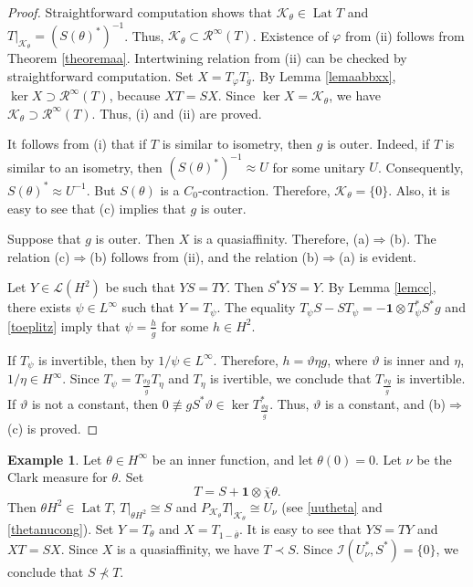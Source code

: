 \documentclass[a4paper,oneside,11pt]{amsart}
\numberwithin{equation}{section}
\theoremstyle{plain}
\theoremstyle{definition}
\newtheorem{example}[theorem]{Example}
\begin{document}
\begin{proof} Straightforward computation shows that 
 $\mathcal K_\theta\in\operatorname{Lat}T$  and $T|_{\mathcal K_\theta}=(S(\theta)^*)^{-1}$. 
Thus, $\mathcal K_\theta\subset\mathcal R^\infty(T)$. Existence of $\varphi$ from (ii) follows from Theorem
\ref{theoremaa}. Intertwining relation from (ii) can be checked by straightforward computation. 
Set $X= T_\varphi T_{\overline g}$. By Lemma \ref{lemaabbxx},   $\ker X\supset\mathcal R^\infty(T)$, 
because $XT=SX$. Since $\ker X=\mathcal K_\theta$, we have $\mathcal K_\theta\supset\mathcal R^\infty(T)$. 
Thus, (i) and (ii) are proved. 


It follows from (i) that if $T$ is similar to isometry, then $g$ is outer. Indeed, if $T$ is similar to an isometry, then 
 $(S(\theta)^*)^{-1}\approx U$ for some unitary $U$. Consequently, $S(\theta)^*\approx U^{-1}$. 
But $S(\theta)$ is a $C_0$-contraction. Therefore, $\mathcal K_\theta=\{0\}$. Also, it is easy to see that (c) implies that $g$ is outer. 

Suppose that $g$ is outer. Then $X$ is a quasiaffinity. Therefore, (a)$\Rightarrow$(b). The relation (c)$\Rightarrow$(b) follows from (ii), and the relation (b)$\Rightarrow$(a) is evident.

Let $Y\in\mathcal L(H^2)$ be such that $YS=TY$. Then $S^*YS=Y$. By Lemma \ref{lemcc},  
 there exists $\psi\in L^\infty$ such that 
$Y=T_\psi$. The equality $T_\psi S-ST_\psi=- \mathbf{1}\otimes T_\psi^*S^*g$ and \eqref{toeplitz} imply that $\psi=\frac{h}{\overline g}$ 
for some $h\in H^2$. 

If $T_\psi$ is invertible, then by {\cite[Lemma 3.1.10]{peller}} $1/\psi\in L^\infty$. Therefore, $h=\vartheta\eta g$,  
where  $\vartheta$ is inner  and $\eta$, $1/\eta\in H^\infty$. Since $T_\psi=T_{\frac{\vartheta g}{\overline g}}T_\eta$ 
and $T_\eta$ is ivertible, we conclude that $T_{\frac{\vartheta g}{\overline g}}$ is invertible. If $\vartheta$
is not a constant, then $0\not\equiv gS^*\vartheta\in\ker T_{\frac{\vartheta g}{\overline g}}^*$. 
Thus, $\vartheta$ is a constant, and (b)$\Rightarrow$(c) is proved.
\end{proof}


\begin{example} Let $\theta\in H^\infty$ be an inner function, and let $\theta(0)=0$. 
Let $\nu$ be the Clark measure for $\theta$. 
Set \begin{equation*} T=S+\mathbf{1}\otimes\overline\chi\theta. \end{equation*} 
Then $\theta H^2\in\operatorname{Lat}T$, $T|_{\theta H^2}\cong S$ and 
$P_{\mathcal K_\theta}T|_{\mathcal K_\theta}\cong U_\nu$ (see \eqref{uutheta} and \eqref{thetanucong}).
Set $Y=T_\theta$ and $X=T_{1-\overline\theta}$. 
It is easy to see that $YS=TY$ and $XT=SX$. 
Since $X$ is a quasiaffinity, we have $T\prec S$. Since $\mathcal I(U_\nu^*,S^*)=\{0\}$, 
we conclude that $S\not\prec T$.
\end{example}
\end{document}
